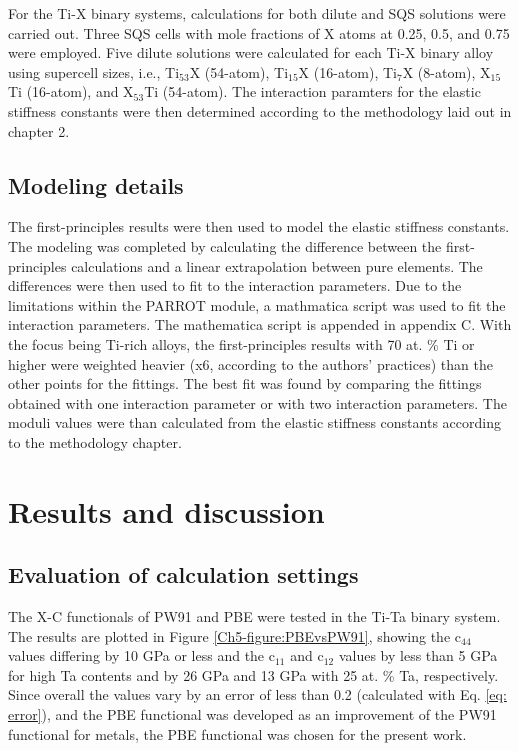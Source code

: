 For the Ti-X binary systems, calculations for both dilute and SQS solutions were carried out. Three SQS cells with mole fractions of X atoms at 0.25, 0.5, and 0.75 were employed. Five dilute solutions were calculated for each Ti-X binary alloy using supercell sizes, i.e., Ti$_{53}$X (54-atom), Ti$_{15}$X (16-atom), Ti$_{7}$X (8-atom), X$_{15}$Ti (16-atom), and X$_{53}$Ti (54-atom). The interaction paramters for the  elastic stiffness constants were then determined according to the methodology laid out in chapter 2. 

\subsection{Modeling details}

The first-principles results were then used to model the elastic stiffness constants. The modeling was completed by calculating the difference between the first-principles calculations and a linear extrapolation between pure elements. The differences were then used to fit to the interaction parameters. Due to the limitations within the PARROT module, a mathmatica script was used to fit the interaction parameters. The mathematica script is appended in appendix C. With the focus being Ti-rich alloys, the first-principles results with 70 at. \% Ti or higher were weighted heavier (x6, according to the authors' practices) than the other points for the fittings. The best fit was found by comparing the fittings obtained with one interaction parameter or with two interaction parameters. The moduli values were than calculated from the elastic stiffness constants according to the methodology chapter.

\section{Results and discussion}

\subsection{Evaluation of calculation settings}

The X-C functionals of PW91 and PBE were tested in the Ti-Ta binary system. The results are plotted in Figure \ref{Ch5-figure:PBEvsPW91}, showing the c$_{44}$ values differing by 10 GPa or less and the c$_{11}$ and c$_{12}$ values by less than 5 GPa for high Ta contents and by 26 GPa and 13 GPa with 25 at. \% Ta, respectively. Since overall the values vary by an error of less than 0.2 (calculated with Eq. \ref{eq: error}), and the PBE functional was developed as an improvement of the PW91 functional for metals, the PBE functional was chosen for the present work. 

